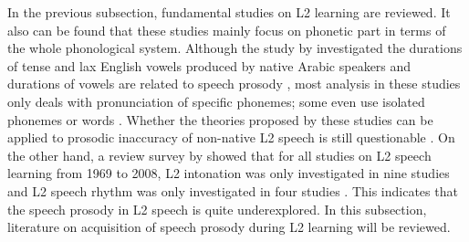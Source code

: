 In the previous subsection, fundamental studies on L2 learning are reviewed. It also can be found that these studies mainly focus on phonetic part in terms of the whole phonological system. Although the study by \cite{munro1993productions} investigated the durations of tense and lax English vowels produced by native Arabic speakers and durations of vowels are related to speech prosody \citep{ramus1999correlates}, most analysis in these studies only deals with pronunciation of specific phonemes; some even use isolated phonemes or words \citep{flege1987production}. Whether the theories proposed by these studies can be applied to prosodic inaccuracy of non-native L2 speech is still questionable \citep{rasier2007prosodic}. On the other hand, a review survey by \cite{gut2009non} showed that for all studies on L2 speech learning from 1969 to 2008, L2 intonation was only investigated in nine studies and L2 speech rhythm was only investigated in four studies \citep{mennen2004bi,altmann2006perception,rasier2007prosodic,lin2008interlanguage}. This indicates that the speech prosody in L2 speech is quite underexplored. In this subsection, literature on acquisition of speech prosody during L2 learning will be reviewed.

